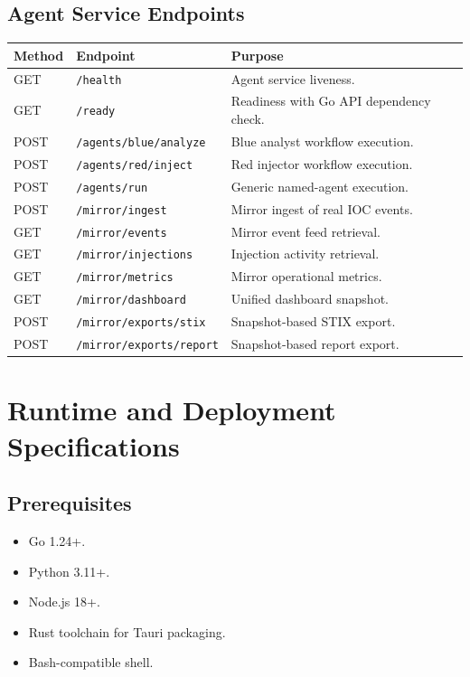 \documentclass[11pt,a4paper]{article}
\begin{document}
\subsection{Agent Service Endpoints}
\begin{longtable}{p{} p{} p{}}
\toprule
\textbf{Method} & \textbf{Endpoint} & \textbf{Purpose} \\
\midrule
GET & \texttt{/health} & Agent service liveness. \\
GET & \texttt{/ready} & Readiness with Go API dependency check. \\
POST & \texttt{/agents/blue/analyze} & Blue analyst workflow execution. \\
POST & \texttt{/agents/red/inject} & Red injector workflow execution. \\
POST & \texttt{/agents/run} & Generic named-agent execution. \\
POST & \texttt{/mirror/ingest} & Mirror ingest of real IOC events. \\
GET & \texttt{/mirror/events} & Mirror event feed retrieval. \\
GET & \texttt{/mirror/injections} & Injection activity retrieval. \\
GET & \texttt{/mirror/metrics} & Mirror operational metrics. \\
GET & \texttt{/mirror/dashboard} & Unified dashboard snapshot. \\
POST & \texttt{/mirror/exports/stix} & Snapshot-based STIX export. \\
POST & \texttt{/mirror/exports/report} & Snapshot-based report export. \\
\bottomrule
\end{longtable}

\section{Runtime and Deployment Specifications}
\subsection{Prerequisites}
\begin{itemize}[leftmargin=1.5em]
  \item Go 1.24+.
  \item Python 3.11+.
  \item Node.js 18+.
  \item Rust toolchain for Tauri packaging.
  \item Bash-compatible shell.
\end{itemize}
\end{document}
